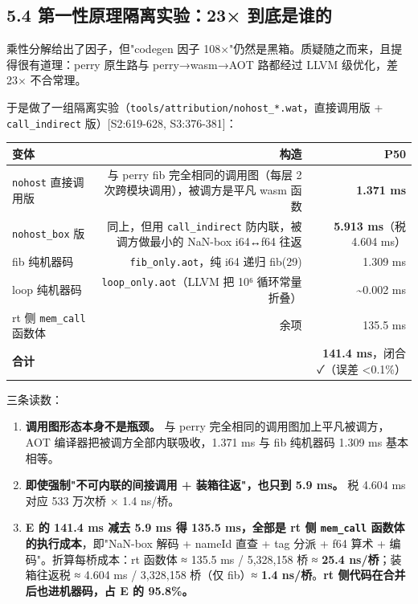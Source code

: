 \documentclass[11pt, a4paper]{article}
\begin{document}
\subsection{5.4 第一性原理隔离实验：23× 到底是谁的}

乘性分解给出了因子，但"codegen 因子 108×"仍然是黑箱。质疑随之而来，且提得很有道理：perry 原生路与 perry→wasm→AOT 路都经过 LLVM 级优化，差 23× 不合常理。


于是做了一组隔离实验（\texttt{tools/attribution/nohost\_*.wat}，直接调用版 + \texttt{call\_indirect} 版）[S2:619-628, S3:376-381]：


\begin{center}\small\begin{tabular}{lrr}
\toprule
变体 & 构造 & P50 \\
\midrule
\texttt{nohost} 直接调用版 & 与 perry fib 完全相同的调用图（每层 2 次跨模块调用），被调方是平凡 wasm 函数 & \textbf{1.371 ms} \\
\texttt{nohost\_box} 版 & 同上，但用 \texttt{call\_indirect} 防内联，被调方做最小的 NaN-box i64↔f64 往返 & \textbf{5.913 ms}（税 4.604 ms） \\
fib 纯机器码 & \texttt{fib\_only.aot}，纯 i64 递归 fib(29) & 1.309 ms \\
loop 纯机器码 & \texttt{loop\_only.aot}（LLVM 把 10⁶ 循环常量折叠） & \textasciitilde{}0.002 ms \\
rt 侧 \texttt{mem\_call} 函数体 & 余项 & 135.5 ms \\
\textbf{合计} &  & \textbf{141.4 ms}，闭合 ✓（误差 <0.1\%） \\
\bottomrule
\end{tabular}\end{center}


三条读数：


\begin{enumerate}
\item \textbf{调用图形态本身不是瓶颈。} 与 perry 完全相同的调用图加上平凡被调方，AOT 编译器把被调方全部内联吸收，1.371 ms 与 fib 纯机器码 1.309 ms 基本相等。
\item \textbf{即使强制"不可内联的间接调用 + 装箱往返"，也只到 5.9 ms。} 税 4.604 ms 对应 533 万次桥 × 1.4 ns/桥。
\item \textbf{E 的 141.4 ms 减去 5.9 ms 得 135.5 ms，全部是 rt 侧 \texttt{mem\_call} 函数体的执行成本}，即"NaN-box 解码 + nameId 直查 + tag 分派 + f64 算术 + 编码"。折算每桥成本：rt 函数体 ≈ 135.5 ms / 5,328,158 桥 ≈ \textbf{25.4 ns/桥}；装箱往返税 ≈ 4.604 ms / 3,328,158 桥（仅 fib）≈ \textbf{1.4 ns/桥}。\textbf{rt 侧代码在合并后也进机器码，占 E 的 95.8\%。}
\end{enumerate}
\end{document}
